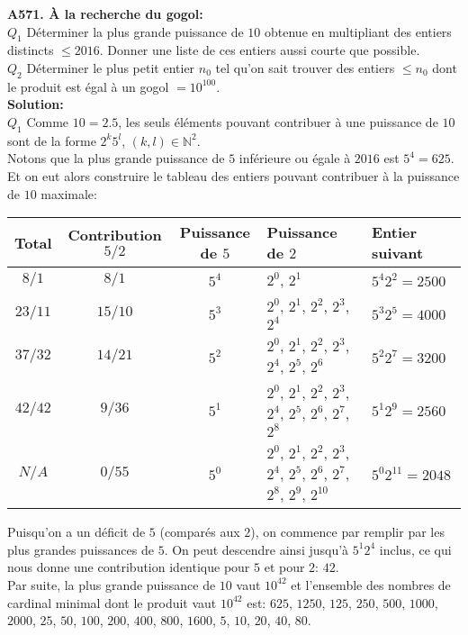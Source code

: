 \documentclass[11pt] {article}
\newcommand{\N} {\mathbb{N}}
\begin{document}



\textbf{A571. À la recherche du gogol:}\\
$Q_{1}$ Déterminer la plus grande puissance de $10$ obtenue en multipliant des entiers distincts $\leq 2016$. Donner une liste de ces entiers aussi courte que possible.\\
$Q_{2}$ Déterminer le plus petit entier $n_{0}$ tel qu'on sait trouver des entiers $\leq n_{0}$ dont le produit est égal à un gogol $= 10^{100}$.\\

\textbf{Solution:}\\
$Q_{1}$ Comme $10 = 2.5$, les seuls éléments pouvant contribuer à une puissance de $10$ sont de la forme $2^{k}5^{l}$, $\left( k,l \right) \in \N^{2}$.\\

Notons que la plus grande puissance de $5$ inférieure ou égale à $2016$ est $5^{4} = 625$. Et on eut alors construire le tableau des entiers pouvant contribuer à la puissance de $10$ maximale:
\begin{center}
	\begin{tabular}{cccll}
		Total & Contribution $5/2$	& Puissance de $5$	& Puissance de $2$	& Entier suivant \\
		\hline
		$8/1$	&	$8/1$	& $5^{4}$	& $2^{0}$, $2^{1}$	& $5^{4}2^{2} = 2500$ \\
		$23/11$	&	$15/10$	& $5^{3}$	& $2^{0}$, $2^{1}$, $2^{2}$, $2^{3}$, $2^{4}$	& $5^{3}2^{5} = 4000$ \\
		$37/32$	&	$14/21$	& $5^{2}$	& $2^{0}$, $2^{1}$, $2^{2}$, $2^{3}$, $2^{4}$, $2^{5}$, $2^{6}$	& $5^{2}2^{7} = 3200$ \\
		$42/42$	&	$9/36$	& $5^{1}$	& $2^{0}$, $2^{1}$, $2^{2}$, $2^{3}$, $2^{4}$, $2^{5}$, $2^{6}$, $2^{7}$, $2^{8}$	& $5^{1}2^{9} = 2560$ \\
		$N/A$	&	$0/55$	& $5^{0}$	& $2^{0}$, $2^{1}$, $2^{2}$, $2^{3}$, $2^{4}$, $2^{5}$, $2^{6}$, $2^{7}$, $2^{8}$, $2^{9}$, $2^{10}$	& $5^{0}2^{11} = 2048$ \\
	\end{tabular}
\end{center}

Puisqu'on a un déficit de $5$ (comparés aux $2$), on commence par remplir par les plus grandes puissances de $5$. On peut descendre ainsi jusqu'à $5^{1}2^{4}$ inclus, ce qui nous donne une contribution identique pour $5$ et pour $2$: $42$.\\
Par suite, la plus grande puissance de $10$ vaut $10^{42}$ et l'ensemble des nombres de cardinal minimal dont le produit vaut $10^{42}$ est: $625$, $1250$, $125$, $250$, $500$, $1000$, $2000$, $25$, $50$, $100$, $200$, $400$, $800$, $1600$, $5$, $10$, $20$, $40$, $80$.\\
\end{document}
